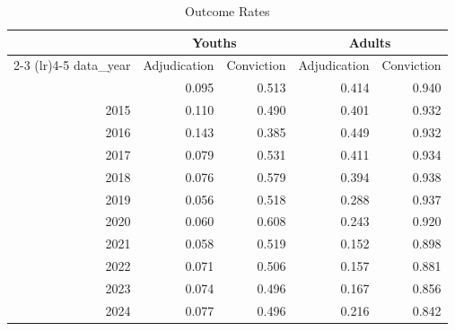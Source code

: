 \begin{table}[!t]
\caption*{
{\large Outcome Rates}
} 

\fontsize{12.0pt}{14.4pt}\selectfont

\begin{tabular*}{\linewidth}{@{\extracolsep{\fill}}rrrrr}
\toprule
 & \multicolumn{2}{c}{Youths} & \multicolumn{2}{c}{Adults} \\ 
\cmidrule(lr){2-3} \cmidrule(lr){4-5}
data\_year & Adjudication & Conviction & Adjudication & Conviction \\ 
\midrule\addlinespace[2.5pt]
2014 & 0.095 & 0.513 & 0.414 & 0.940 \\
2015 & 0.110 & 0.490 & 0.401 & 0.932 \\
2016 & 0.143 & 0.385 & 0.449 & 0.932 \\
2017 & 0.079 & 0.531 & 0.411 & 0.934 \\
2018 & 0.076 & 0.579 & 0.394 & 0.938 \\
2019 & 0.056 & 0.518 & 0.288 & 0.937 \\
2020 & 0.060 & 0.608 & 0.243 & 0.920 \\
2021 & 0.058 & 0.519 & 0.152 & 0.898 \\
2022 & 0.071 & 0.506 & 0.157 & 0.881 \\
2023 & 0.074 & 0.496 & 0.167 & 0.856 \\
2024 & 0.077 & 0.496 & 0.216 & 0.842 \\
\bottomrule
\end{tabular*}

\end{table}
